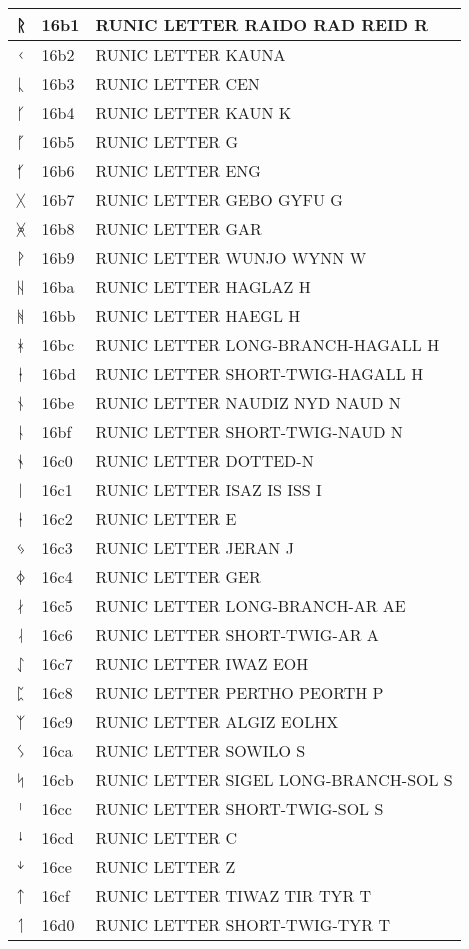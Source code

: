 \documentclass[12pt,letterpaper,openany]{book}
\begin{document}
\begin{center}
\begin{supertabular}{|m{0.25in}|m{0.5in}|m{4in}|}
ᚱ & 16b1 & RUNIC LETTER RAIDO RAD REID R\\\hline
ᚲ & 16b2 & RUNIC LETTER KAUNA\\\hline
ᚳ & 16b3 & RUNIC LETTER CEN\\\hline
ᚴ & 16b4 & RUNIC LETTER KAUN K\\\hline
ᚵ & 16b5 & RUNIC LETTER G\\\hline
ᚶ & 16b6 & RUNIC LETTER ENG\\\hline
ᚷ & 16b7 & RUNIC LETTER GEBO GYFU G\\\hline
ᚸ & 16b8 & RUNIC LETTER GAR\\\hline
ᚹ & 16b9 & RUNIC LETTER WUNJO WYNN W\\\hline
ᚺ & 16ba & RUNIC LETTER HAGLAZ H\\\hline
ᚻ & 16bb & RUNIC LETTER HAEGL H\\\hline
ᚼ & 16bc & RUNIC LETTER LONG-BRANCH-HAGALL H\\\hline
ᚽ & 16bd & RUNIC LETTER SHORT-TWIG-HAGALL H\\\hline
ᚾ & 16be & RUNIC LETTER NAUDIZ NYD NAUD N\\\hline
ᚿ & 16bf & RUNIC LETTER SHORT-TWIG-NAUD N\\\hline
ᛀ & 16c0 & RUNIC LETTER DOTTED-N\\\hline
ᛁ & 16c1 & RUNIC LETTER ISAZ IS ISS I\\\hline
ᛂ & 16c2 & RUNIC LETTER E\\\hline
ᛃ & 16c3 & RUNIC LETTER JERAN J\\\hline
ᛄ & 16c4 & RUNIC LETTER GER\\\hline
ᛅ & 16c5 & RUNIC LETTER LONG-BRANCH-AR AE\\\hline
ᛆ & 16c6 & RUNIC LETTER SHORT-TWIG-AR A\\\hline
ᛇ & 16c7 & RUNIC LETTER IWAZ EOH\\\hline
ᛈ & 16c8 & RUNIC LETTER PERTHO PEORTH P\\\hline
ᛉ & 16c9 & RUNIC LETTER ALGIZ EOLHX\\\hline
ᛊ & 16ca & RUNIC LETTER SOWILO S\\\hline
ᛋ & 16cb & RUNIC LETTER SIGEL LONG-BRANCH-SOL S\\\hline
ᛌ & 16cc & RUNIC LETTER SHORT-TWIG-SOL S\\\hline
ᛍ & 16cd & RUNIC LETTER C\\\hline
ᛎ & 16ce & RUNIC LETTER Z\\\hline
ᛏ & 16cf & RUNIC LETTER TIWAZ TIR TYR T\\\hline
ᛐ & 16d0 & RUNIC LETTER SHORT-TWIG-TYR T\\\hline

\end{supertabular}
\end{center}
\end{document}
